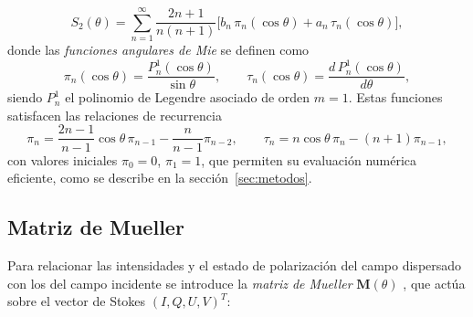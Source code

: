 \begin{equation}
  S_2(\theta) = \sum_{n=1}^{\infty} \frac{2n+1}{n(n+1)}
  \bigl[ b_n\,\pi_n(\cos\theta) + a_n\,\tau_n(\cos\theta) \bigr],
\end{equation}
donde las \textit{funciones angulares de Mie} se definen como
\begin{equation}
  \pi_n(\cos\theta) = \frac{P_n^1(\cos\theta)}{\sin\theta},
  \qquad
  \tau_n(\cos\theta) = \frac{d\,P_n^1(\cos\theta)}{d\theta},
\end{equation}
siendo $P_n^1$ el polinomio de Legendre asociado de orden $m = 1$. Estas
funciones satisfacen las relaciones de recurrencia
\begin{equation}
  \pi_n = \frac{2n-1}{n-1}\cos\theta\,\pi_{n-1} - \frac{n}{n-1}\pi_{n-2},
  \qquad
  \tau_n = n\cos\theta\,\pi_n - (n+1)\pi_{n-1},
\end{equation}
con valores iniciales $\pi_0 = 0$, $\pi_1 = 1$, que permiten su evaluación
numérica eficiente, como se describe en la sección~\ref{sec:metodos}.



\subsection{Matriz de Mueller}

Para relacionar las intensidades y el estado de polarización del campo
dispersado con los del campo incidente se introduce la \textit{matriz de
Mueller} $\mathbf{M}(\theta)$ \cite{Bohren1983,Mishchenko2002}, que actúa sobre el vector de Stokes
$(I, Q, U, V)^T$:

